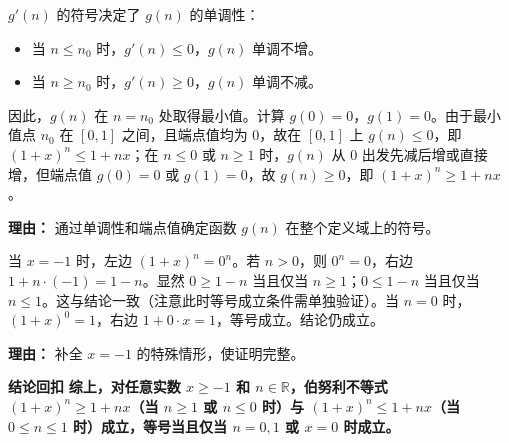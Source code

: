 \begin{proofbox}
\begin{description}[style=nextline, leftmargin=2.8em, labelsep=0.5em, itemsep=0.55em]
    \item[\textbf{步骤五（确定原函数最值）：}] $g'(n)$ 的符号决定了 $g(n)$ 的单调性：
    \begin{itemize}[leftmargin=*, itemsep=0.2em, topsep=0.2em]
        \item 当 $n \leq n_0$ 时，$g'(n) \leq 0$，$g(n)$ 单调不增。
        \item 当 $n \geq n_0$ 时，$g'(n) \geq 0$，$g(n)$ 单调不减。
    \end{itemize}
    因此，$g(n)$ 在 $n = n_0$ 处取得最小值。计算 $g(0)=0$，$g(1)=0$。由于最小值点 $n_0$ 在 $[0,1]$ 之间，且端点值均为 $0$，故在 $[0,1]$ 上 $g(n) \leq 0$，即 $(1+x)^n \leq 1+nx$；在 $n \leq 0$ 或 $n \geq 1$ 时，$g(n)$ 从 $0$ 出发先减后增或直接增，但端点值 $g(0)=0$ 或 $g(1)=0$，故 $g(n) \geq 0$，即 $(1+x)^n \geq 1+nx$。
    \par\textbf{理由：} 通过单调性和端点值确定函数 $g(n)$ 在整个定义域上的符号。

    \item[\textbf{步骤六（处理边界情况）：}] 当 $x=-1$ 时，左边 $(1+x)^n = 0^n$。若 $n>0$，则 $0^n=0$，右边 $1+n\cdot(-1)=1-n$。显然 $0 \geq 1-n$ 当且仅当 $n \geq 1$；$0 \leq 1-n$ 当且仅当 $n \leq 1$。这与结论一致（注意此时等号成立条件需单独验证）。当 $n=0$ 时，$(1+x)^0=1$，右边 $1+0\cdot x=1$，等号成立。结论仍成立。
    \par\textbf{理由：} 补全 $x=-1$ 的特殊情形，使证明完整。
\end{description}

\medskip
\textbf{\textcolor{CProof}{结论回扣}}
\textbf{综上，对任意实数 $x \geq -1$ 和 $n \in \mathbb{R}$，伯努利不等式 $(1+x)^n \geq 1+nx$（当 $n \geq 1$ 或 $n \leq 0$ 时）与 $(1+x)^n \leq 1+nx$（当 $0 \leq n \leq 1$ 时）成立，等号当且仅当 $n=0,1$ 或 $x=0$ 时成立。}
\end{proofbox}
